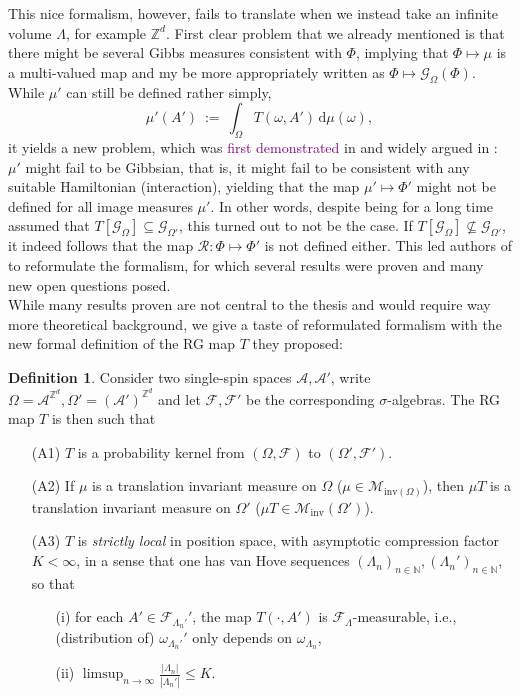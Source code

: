 \documentclass[12pt]{article}
\newcommand{\A}{\mathcal{A}}
\renewcommand{\d}{\mathrm{d}}
\newcommand{\F}{\mathcal{F}}
\newcommand{\G}{\mathcal{G}}
\newcommand{\M}{\mathcal{M}}
\newcommand{\N}{\mathbb{N}}
\newcommand{\RR}{\mathcal{R}}
\newcommand{\Z}{\mathbb{Z}}
\newcommand{\ra}{\rightarrow}
\newcommand{\pika}{\boldsymbol{\cdot}}
\newcommand{\1}{\mathbbm{1}}
\newcommand{\5}{\vspace{0.5cm}}
\theoremstyle{definition}
\newtheorem{df}[thm]{Definition}
\begin{document}
This nice formalism, however, fails to translate when we instead take an infinite volume $\Lambda$, for example $\Z^d$. First clear problem that we already mentioned is that there might be several Gibbs measures consistent with $\Phi$, implying that $\Phi\mapsto\mu$ is a multi-valued map and my be more appropriately written as $\Phi\mapsto\G_\Omega(\Phi)$. While $\mu'$ can still be defined rather simply,
$$\mu'(A') ~:=~ \int_\Omega T(\omega,A')\,\d\mu(\omega),$$
it yields a new problem, which was \textcolor{purple}{first demonstrated} in \cite{Isr} and widely argued in \cite{EFS}: $\mu'$ might fail to be Gibbsian, that is, it might fail to be consistent with any suitable Hamiltonian (interaction), yielding that the map $\mu'\mapsto\Phi'$ might not be defined for all image measures $\mu'$. In other words, despite being for a long time assumed that $T[\G_\Omega]\subseteq\G_{\Omega'}$, this turned out to not be the case. If $T[\G_\Omega]\not\subseteq\G_{\Omega'}$, it indeed follows that the map $\RR:\Phi\mapsto\Phi'$ is not defined either. This led authors of \cite{EFS} to reformulate the formalism, for which several results were proven and many new open questions posed. \\

While many results proven are not central to the thesis and would require way more theoretical background, we give a taste of reformulated formalism with the new formal definition of the RG map $T$ they proposed:
\begin{df}
Consider two single-spin spaces $\A,\A'$, write $\Omega=\A^{\Z^d},\Omega'=(\A')^{\Z^{d}}$ and let $\F,\F'$ be the corresponding $\sigma$-algebras. The RG map $T$ is then such that 
\begin{itemize}
	\item[(A1)] $T$ is a probability kernel from $(\Omega,\F)$ to $(\Omega',\F')$.
	\item[(A2)] If $\mu$ is a translation invariant measure on $\Omega$ ($\mu\in\M_{\mathrm{inv}(\Omega)}$), then $\mu T$ is a translation invariant measure on $\Omega'$ ($\mu T\in\M_{\mathrm{inv}}(\Omega')$).
	\item[(A3)] $T$ is \textit{strictly local} in position space, with asymptotic compression factor $K<\infty$, in a sense that one has van Hove sequences $(\Lambda_n)_{n\in\N},(\Lambda_n')_{n\in\N}$, so that
	\begin{itemize}
		\item[(i)] for each $A'\in\F_{\Lambda_n'}'$, the map $T(\pika,A')$ is $\F_\Lambda$-measurable, i.e., (distribution of) $\omega_{\Lambda_n'}'$ only depends on $\omega_{\Lambda_n}$,
		\item[(ii)] $\limsup_{n\ra\infty}\frac{|\Lambda_n|}{|\Lambda_n'|}\leq K$.
	\end{itemize}
\end{itemize}
\end{df}
\end{document}
